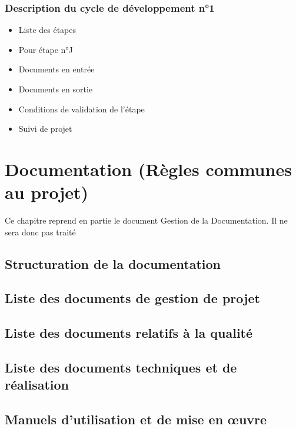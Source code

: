 \subsubsection{Description du cycle de développement n°1}
\begin{itemize}
  \item Liste des étapes
  \item Pour étape n°J
  \item Documents en entrée
  \item Documents en sortie
  \item Conditions de validation de l’étape
  \item Suivi de projet
\end{itemize}
















 
\section{Documentation (Règles communes au projet)}
\begin{center} \begin{Large}Ce chapitre reprend en partie le document Gestion de la Documentation. Il ne sera donc pas traité\end{Large}  \end{center}
\subsection{Structuration de la documentation}
\subsection{Liste des documents de gestion de projet}
\subsection{Liste des documents relatifs à la qualité}
\subsection{Liste des documents techniques et de réalisation}
\subsection{Manuels d’utilisation et de mise en œuvre}

